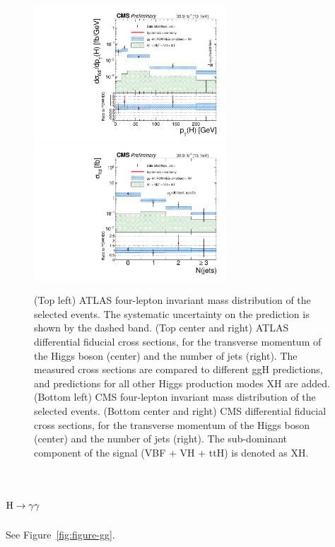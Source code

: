 \documentclass[10pt]{article}
\begin{document}
\begin{figure}[htb]
\includegraphics[height=2in]{figures/CMS-HIG-16-041__Figure_009-b__pT4l.pdf}
\includegraphics[height=2in]{figures/CMS-HIG-16-041__Figure_009-c__njets.pdf}
\caption{
  (Top left) ATLAS four-lepton invariant mass distribution of the selected
  events. The systematic uncertainty on the prediction is shown by the dashed
  band.
  (Top center and right) ATLAS differential fiducial cross sections, for the
  transverse momentum of the Higgs boson (center) and the number of jets (right).
  The measured cross sections are compared to different ggH predictions, and
  predictions for all other Higgs production modes XH are added.
  (Bottom left) CMS four-lepton invariant mass distribution of the selected
  events.
  (Bottom center and right) CMS differential fiducial cross sections, for the
  transverse momentum of the Higgs boson (center) and the number of jets (right).
  The sub-dominant component of the signal (VBF + VH + ttH) is denoted as XH.
}
\label{fig:figure-ZZ}
\end{figure}


\section{\boldmath ${\rm H}\to\gamma\gamma$}

See Figure~\ref{fig:figure-gg}.
\end{document}
